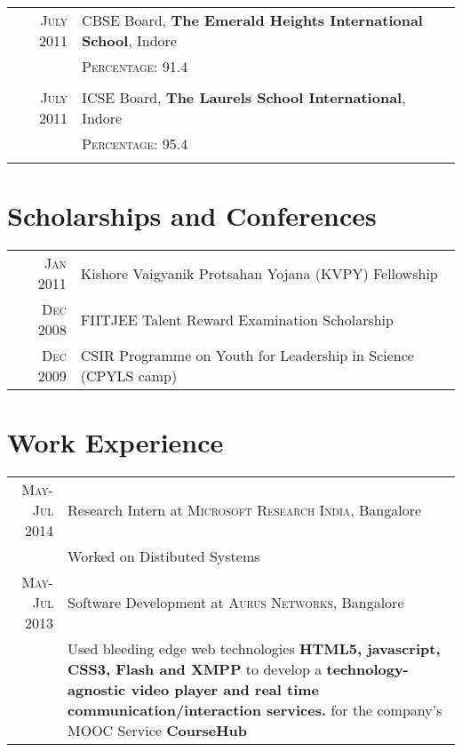 \documentclass[a4paper,10pt]{article} %
\begin{document}
\begin{tabular}{rl}
    \textsc{July} 2011 & \textsc{CBSE} Board, \normalsize\textbf{The Emerald Heights International School}, Indore\\
                       &\normalsize \textsc{Percentage}: 91.4 \\
                       \\

    \textsc{July} 2011 & \textsc{ICSE} Board,  \normalsize\textbf{The Laurels School International}, Indore \\
                       & \normalsize \textsc{Percentage}: 95.4 \\
                       \\

\end{tabular}

\section{Scholarships and Conferences}

\begin{tabular}{rl}

    \textsc{Jan} 2011 & Kishore Vaigyanik Protsahan Yojana (KVPY) Fellowship \\
    \textsc{Dec} 2008 & FIITJEE Talent Reward Examination Scholarship \\
    \textsc{Dec} 2009 & CSIR Programme on Youth for Leadership in Science (CPYLS camp) \\

\end{tabular}


\section{Work Experience}

\begin{tabular}{r|p{11cm}}
    \textsc{May-Jul 2014} & Research Intern at \textsc{Microsoft Research India}, Bangalore\emph{}\\
        & \footnotesize{Worked on Distibuted Systems} \\

    \textsc{May-Jul 2013} & Software Development at \textsc{Aurus Networks}, Bangalore\emph{}\\
        & \footnotesize{Used bleeding edge web technologies \textbf{HTML5, javascript, CSS3, Flash and XMPP} to develop a
            \textbf{technology-agnostic video player and real time communication/interaction services.}
            for the company's MOOC Service \textbf{CourseHub}}

\end{tabular}
\end{document}

